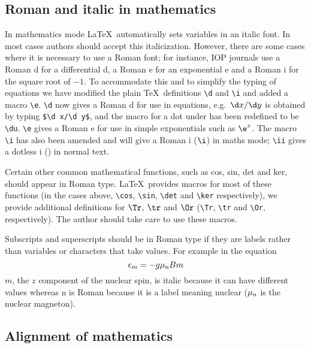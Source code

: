 \subsection{Roman and italic in mathematics}
In mathematics mode \LaTeX\ automatically sets variables in an italic
font. In most cases authors should accept this italicization. However,
there are some cases where it is necessary to use a Roman font; for
instance, IOP journals use a Roman d for a differential d, a Roman e
for an exponential e and a Roman i for the square root of $-1$. To
accommodate this and to simplify the  typing of equations we have
modified the plain \TeX\ definitions \verb"\d" and \verb"\i"
and added a macro
\verb"\e". \verb"\d" now gives a Roman d for use in equations,
e.g.\ $\d x/\d y$
is obtained by typing \verb"$\d x/\d y$", and the macro for a dot under has
been redefined to be \verb"\du". \verb"\e" gives a Roman e for use in simple
exponentials such as $\e^x$. The macro \verb"\i" has also been amended and
will give a Roman i ($\i$) in maths mode; \verb"\ii" gives a dotless i
(\ii) in normal text.

Certain other common mathematical functions, such as cos, sin, det and
ker, should appear in Roman type. \LaTeX\ provides macros for
most of these functions
(in the cases above, \verb"\cos", \verb"\sin", \verb"\det" and \verb"\ker"
respectively), we provide additional definitions for $\Tr$, $\tr$ and
$\Or$ (\verb"\Tr", \verb"\tr" and \verb"\Or", respectively).
The author should take care to use these macros.

Subscripts and superscripts should be in Roman type if they are labels
rather than variables or characters that take values. For example in the
equation
\[
\epsilon_m=-g\mu_{\rm n}Bm
\]
$m$, the $z$ component of the nuclear spin, is italic because it can have
different values whereas n is Roman because it
is a label meaning nuclear ($\mu_{\rm n}$
is the nuclear magneton).



\subsection{Alignment of mathematics}
